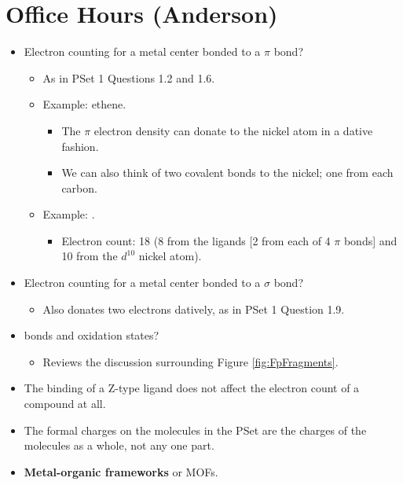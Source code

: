 \documentclass[../notes.tex]{subfiles}
\begin{document}
\section{Office Hours (Anderson)}
\begin{itemize}
    \item {}Electron counting for a metal center bonded to a $\pi$ bond?
    \begin{itemize}
        \item As in PSet 1 Questions 1.2 and 1.6.
        \item Example: ethene.
        \begin{itemize}
            \item The $\pi$ electron density can donate to the nickel atom in a dative fashion.
            \item We can also think of two covalent bonds to the nickel; one from each carbon.
        \end{itemize}
        \item Example: .
        \begin{itemize}
            \item Electron count: 18 (8 from the ligands [2 from each of 4 $\pi$ bonds] and 10 from the $d^{10}$ nickel atom).
        \end{itemize}
    \end{itemize}
    \item Electron counting for a metal center bonded to a $\sigma$ bond?
    \begin{itemize}
        \item Also donates two electrons datively, as in PSet 1 Question 1.9.
    \end{itemize}
    \item {} bonds and oxidation states?
    \begin{itemize}
        \item Reviews the discussion surrounding Figure \ref{fig:FpFragments}.
    \end{itemize}
    \item The binding of a Z-type ligand does not affect the electron count of a compound at all.
    \item The formal charges on the molecules in the PSet are the charges of the molecules as a whole, not any one part.
    \item \textbf{Metal-organic frameworks} or MOFs.
\end{itemize}
\end{document}

